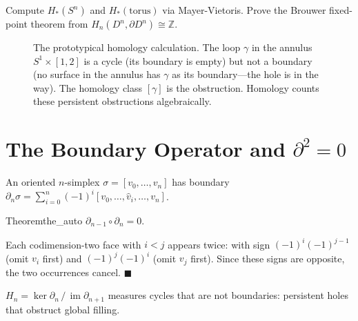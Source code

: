 \documentclass[12pt, twoside, openright, a4paper]{book}
\renewenvironment{proof}{%
  \par\medskip\noindent{\color{RSVPgreen}\bfseries\sffamily Proof.}\enspace\ignorespaces
}{\hfill{\color{RSVPgreen}$\blacksquare$}\par\medskip}
\newcommand{\Z}{\mathbb{Z}}
\DeclareMathOperator{\im}{im}
\begin{document}
\begin{exercises_box}
Compute $H_*(S^n)$ and $H_*(\text{torus})$ via Mayer-Vietoris.
Prove the Brouwer fixed-point theorem from $H_n(D^n,\partial D^n) \cong \Z$.
\end{exercises_box}


\begin{figure}[h]
\centering
{}
\caption{The prototypical homology calculation. The loop $\gamma$ in the annulus
$S^1 \times [1,2]$ is a cycle (its boundary is empty) but not a boundary (no
surface in the annulus has $\gamma$ as its boundary---the hole is in the way).
The homology class $[\gamma]$ is the obstruction. Homology counts these
persistent obstructions algebraically.}
\label{fig:failed-filling}
\end{figure}

\section{The Boundary Operator and $\partial^2 = 0$}

An oriented $n$-simplex $\sigma = [v_0,\ldots,v_n]$ has boundary
$\partial_n\sigma = \sum_{i=0}^n (-1)^i [v_0,\ldots,\hat v_i,\ldots,v_n]$.

\begin{theorem}{Theorem}{the_auto}
$\partial_{n-1} \circ \partial_n = 0$.
\end{theorem}
\begin{proof}
Each codimension-two face with $i < j$ appears twice: with sign $(-1)^i(-1)^{j-1}$ (omit $v_i$ first) and $(-1)^j(-1)^i$ (omit $v_j$ first).
Since these signs are opposite, the two occurrences cancel.
\end{proof}

$H_n = \ker\partial_n\,/\,\im\partial_{n+1}$ measures cycles that are not boundaries: persistent holes that obstruct global filling.
\end{document}
